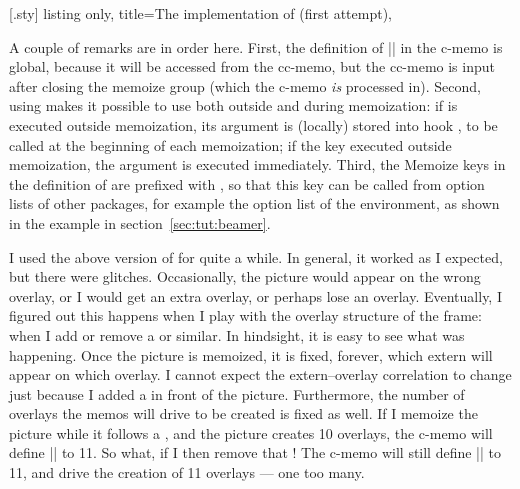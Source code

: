 \documentclass[a4paper,11pt]{article}
\begin{document}
[.sty]{
  listing only,
  title={The implementation of  (first attempt)},
}

A couple of remarks are in order here.  First, the definition of
|\mmzBeamerOverlays| in the c-memo is global, because it will be accessed from
the cc-memo, but the cc-memo is input after closing the memoize group (which
the c-memo \emph{is} processed in).  Second, using  makes it possible to use  both outside and
during memoization: if  is executed outside
memoization, its argument is (locally) stored into hook
, to be called at the beginning of each
memoization; if the key executed outside memoization, the argument is executed
immediately.  Third, the Memoize keys in the definition of 
are prefixed with , so that this key can be called from
 option lists of other packages, for example the option list of
the  environment, as shown in the example in
section~\ref{sec:tut:beamer}.

I used the above version of  for quite a while.  In
general, it worked as I expected, but there were glitches.  Occasionally, the
picture would appear on the wrong overlay, or I would get an extra overlay, or
perhaps lose an overlay.  Eventually, I figured out this happens when I play
with the overlay structure of the frame: when I add or remove a  or
similar.  In hindsight, it is easy to see what was happening.  Once the picture
is memoized, it is fixed, forever, which extern will appear on which overlay.
I cannot expect the extern--overlay correlation to change just because I added
a  in front of the picture.  Furthermore, the number of overlays the
memos will drive to be created is fixed as well.  If I memoize the picture
while it follows a , and the picture creates 10 overlays, the c-memo
will define |\mmzBeamerOverlays| to 11.  So what, if I then remove that
!  The c-memo will still define |\mmzBeamerOverlays| to 11, and drive
the creation of 11 overlays --- one too many.
\end{document}
